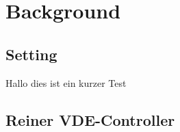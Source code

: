 \chapter{Background}
\label{chap:background}
\section{Setting}
\label{cap:background_sec:setting}
Hallo dies ist ein kurzer Test
\section{Reiner VDE-Controller}
